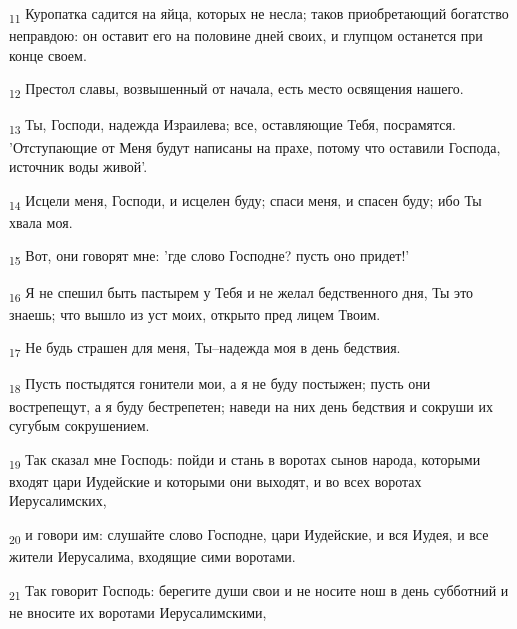 \begin{tcolorbox}
\textsubscript{11} Куропатка садится на яйца, которых не несла; таков приобретающий богатство неправдою: он оставит его на половине дней своих, и глупцом останется при конце своем.
\end{tcolorbox}
\begin{tcolorbox}
\textsubscript{12} Престол славы, возвышенный от начала, есть место освящения нашего.
\end{tcolorbox}
\begin{tcolorbox}
\textsubscript{13} Ты, Господи, надежда Израилева; все, оставляющие Тебя, посрамятся. 'Отступающие от Меня будут написаны на прахе, потому что оставили Господа, источник воды живой'.
\end{tcolorbox}
\begin{tcolorbox}
\textsubscript{14} Исцели меня, Господи, и исцелен буду; спаси меня, и спасен буду; ибо Ты хвала моя.
\end{tcolorbox}
\begin{tcolorbox}
\textsubscript{15} Вот, они говорят мне: 'где слово Господне? пусть оно придет!'
\end{tcolorbox}
\begin{tcolorbox}
\textsubscript{16} Я не спешил быть пастырем у Тебя и не желал бедственного дня, Ты это знаешь; что вышло из уст моих, открыто пред лицем Твоим.
\end{tcolorbox}
\begin{tcolorbox}
\textsubscript{17} Не будь страшен для меня, Ты--надежда моя в день бедствия.
\end{tcolorbox}
\begin{tcolorbox}
\textsubscript{18} Пусть постыдятся гонители мои, а я не буду постыжен; пусть они вострепещут, а я буду бестрепетен; наведи на них день бедствия и сокруши их сугубым сокрушением.
\end{tcolorbox}
\begin{tcolorbox}
\textsubscript{19} Так сказал мне Господь: пойди и стань в воротах сынов народа, которыми входят цари Иудейские и которыми они выходят, и во всех воротах Иерусалимских,
\end{tcolorbox}
\begin{tcolorbox}
\textsubscript{20} и говори им: слушайте слово Господне, цари Иудейские, и вся Иудея, и все жители Иерусалима, входящие сими воротами.
\end{tcolorbox}
\begin{tcolorbox}
\textsubscript{21} Так говорит Господь: берегите души свои и не носите нош в день субботний и не вносите их воротами Иерусалимскими,
\end{tcolorbox}
